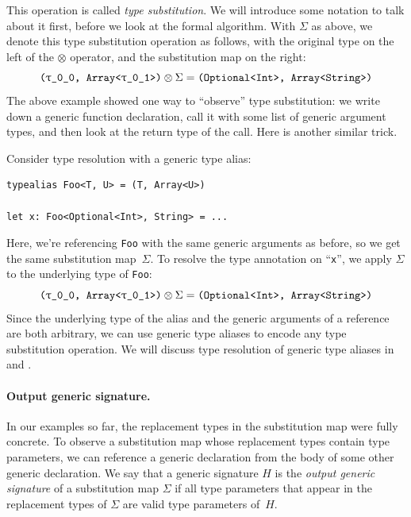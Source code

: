 \documentclass[../generics]{subfiles}
\begin{document}
This operation is called \emph{type substitution}. We will introduce some notation to talk about it first, before we look at the formal algorithm. With $\Sigma$ as above, we denote this type substitution operation as follows, with the original type on the left of the $\otimes$ operator, and the substitution map on the right:
\[
\texttt{(\rT, Array<\rU>)} \otimes \Sigma = \texttt{(Optional<Int>, Array<String>)}
\]
The above example showed one way to ``observe'' type substitution: we write down a generic function declaration, call it with some list of generic argument types, and then look at the return type of the call. Here is another similar trick.

\begin{example}
Consider type resolution with a generic type alias:
\begin{Verbatim}
typealias Foo<T, U> = (T, Array<U>)

let x: Foo<Optional<Int>, String> = ...
\end{Verbatim}
Here, we're referencing \texttt{Foo} with the same generic arguments as before, so we get the same substitution map~$\Sigma$. To resolve the type annotation on ``\texttt{x}'', we apply $\Sigma$ to the underlying type of \texttt{Foo}:
\[
\texttt{(\rT, Array<\rU>)} \otimes \Sigma = \texttt{(Optional<Int>, Array<String>)}
\]
Since the underlying type of the alias and the generic arguments of a reference are both arbitrary, we can use generic type aliases to encode any type substitution operation. We will discuss type resolution of generic type aliases in  and .
\end{example}

\paragraph{Output generic signature.}
In our examples so far, the replacement types in the substitution map were fully concrete. To observe a substitution map whose replacement types contain type parameters, we can reference a generic declaration from the body of some other generic declaration. We say that a generic signature $H$ is the \emph{output generic signature} of a substitution map $\Sigma$ if all type parameters that appear in the replacement types of $\Sigma$ are valid type parameters of~$H$.
\end{document}
